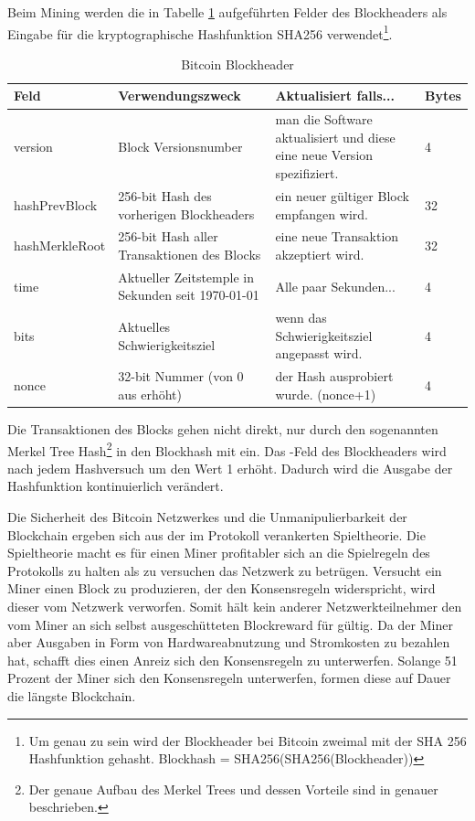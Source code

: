 Beim Mining werden die in Tabelle \ref{tab:btc_block_header} aufgeführten Felder des Blockheaders als Eingabe für die kryptographische Hashfunktion SHA256 verwendet\footnote{Um genau zu sein wird der Blockheader bei Bitcoin zweimal mit der SHA 256 Hashfunktion gehasht. Blockhash = SHA256(SHA256(Blockheader))}.
\begin{table}[H]
\centering
\caption{Bitcoin Blockheader}
\label{tab:btc_block_header}
\begin{tabular}{|l|p{}|p{}|l|}
\hline
\textbf{Feld}  & \textbf{Verwendungszweck}                         & \textbf{Aktualisiert falls...}                                          & \textbf{Bytes} \\ \hline
version        & Block Versionsnumber                             & man die Software aktualisiert und diese eine neue Version spezifiziert. & 4              \\ \hline
hashPrevBlock  & 256-bit Hash des vorherigen Blockheaders          & ein neuer gültiger Block empfangen wird.                                & 32             \\ \hline
hashMerkleRoot & 256-bit Hash aller Transaktionen des Blocks       & eine neue Transaktion akzeptiert wird.                                  & 32             \\ \hline
time           & Aktueller Zeitstemple in Sekunden seit 1970-01-01 & Alle paar Sekunden...                                                   & 4              \\ \hline
bits           & Aktuelles Schwierigkeitsziel                      & wenn das Schwierigkeitsziel angepasst wird.                             & 4              \\ \hline
nonce          & 32-bit Nummer (von 0 aus erhöht)                  & der Hash ausprobiert wurde. (nonce+1)                                   & 4              \\ \hline
\end{tabular}
\end{table}
Die Transaktionen des Blocks gehen nicht direkt, nur durch den sogenannten Merkel Tree Hash\footnote{Der genaue Aufbau des Merkel Trees und dessen Vorteile sind in \cite{bitcoin_white_paper} genauer beschrieben.} in den Blockhash mit ein. Das -Feld des Blockheaders wird nach jedem Hashversuch um den Wert 1 erhöht. Dadurch wird die Ausgabe der Hashfunktion kontinuierlich verändert.

Die Sicherheit des Bitcoin Netzwerkes und die Unmanipulierbarkeit der Blockchain ergeben sich aus der im Protokoll verankerten Spieltheorie. Die Spieltheorie macht es für einen Miner profitabler sich an die Spielregeln des Protokolls zu halten als zu versuchen das Netzwerk zu betrügen. Versucht ein Miner einen Block zu produzieren, der den Konsensregeln widerspricht, wird dieser vom Netzwerk verworfen. Somit hält kein anderer Netzwerkteilnehmer den vom Miner an sich selbst ausgeschütteten Blockreward für gültig. Da der Miner aber Ausgaben in Form von Hardwareabnutzung und Stromkosten zu bezahlen hat, schafft dies einen Anreiz sich den Konsensregeln zu unterwerfen. Solange 51 Prozent der Miner sich den Konsensregeln unterwerfen, formen diese auf Dauer die längste Blockchain. 

